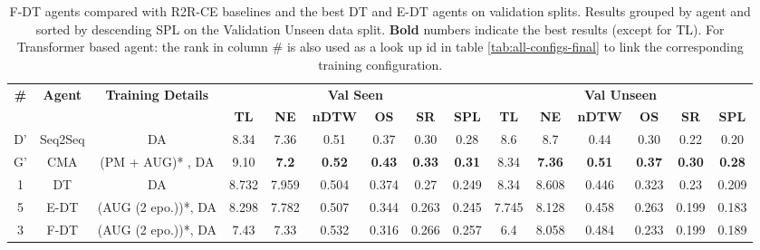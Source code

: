 \begin{table}
\centering
\caption{\label{tab:f_dt_final}F-DT agents compared with R2R-CE baselines and the best DT and E-DT agents on validation splits. Results grouped by agent and sorted by descending SPL on the Validation Unseen data split. \textbf{Bold} numbers indicate the best results (except for TL). For Transformer based agent: the rank in column \# is also used as a look up id in table \ref{tab:all-configs-final} to link the corresponding training configuration.}
\begin{tabular}{@{\hskip3pt}c@{\hskip3pt}c@{\hskip3pt}c@{\hskip3pt}c@{\hskip3pt}c@{\hskip3pt}c@{\hskip3pt}c@{\hskip3pt}c@{\hskip3pt}c@{\hskip3pt}c@{\hskip3pt}c@{\hskip3pt}c@{\hskip3pt}c@{\hskip3pt}c@{\hskip3pt}c}
\toprule
\textbf{\#} & \textbf{Agent} & \textbf{Training Details} & \multicolumn{6}{c}{\textbf{Val Seen}} & \multicolumn{6}{c}{\textbf{Val Unseen}} \\
\cmidrule(l){4-9}\cmidrule(l){10-15} \textbf{~} &     \textbf{~} &                \textbf{~} &       \textbf{TL} &    \textbf{NE} &   \textbf{nDTW} &     \textbf{OS} &     \textbf{SR} &    \textbf{SPL} &         \textbf{TL} &     \textbf{NE} &   \textbf{nDTW} &     \textbf{OS} &    \textbf{SR} &    \textbf{SPL} \\
\midrule
          D' & Seq2Seq & DA & 8.34 & 7.36 & 0.51 & 0.37 & 0.30 & 0.28 & 8.6 & 8.7 & 0.44 & 0.30 & 0.22 & 0.20 \\
          \midrule
          G' & CMA & (PM + AUG)* , DA  & 9.10 & \textbf{7.2} & \textbf{0.52} & \textbf{0.43} & \textbf{0.33} & \textbf{0.31} & 8.34 & \textbf{7.36} & \textbf{0.51} & \textbf{0.37} & \textbf{0.30} & \textbf{0.28} \\
          \midrule
          1 &             DT &                  DA &             8.732 &          7.959 &           0.504 &  0.374 &            0.27 &           0.249 &                8.34 &           8.608 &           0.446 &  0.323 &  0.23 &  0.209 \\
         \midrule
          5 &           E-DT &  (AUG (2 epo.))*, DA &             8.298 &          7.782 &           0.507 &           0.344 &           0.263 &           0.245 &               7.745 &           8.128 &           0.458 &           0.263 &          0.199 &           0.183 \\
          \midrule
          3 &           F-DT &  (AUG (2 epo.))*, DA &              7.43 &  7.33 &  0.532 &           0.316 &           0.266 &  0.257 &                 6.4 &  8.058 &  0.484 &           0.233 &          0.199 &           0.189 \\

\end{tabular}
\end{table}
